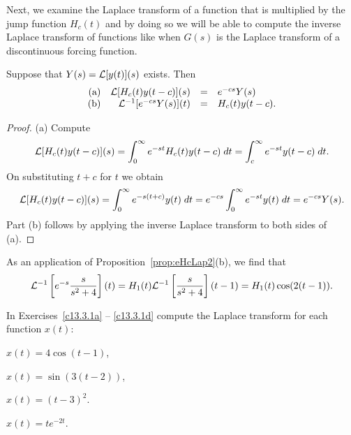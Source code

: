 \documentclass{ximera}
\begin{document}
Next, we examine the Laplace transform of a function that is multiplied 
by the jump function $H_c(t)$ and by doing so we will be able to compute the
inverse Laplace transform of functions like  when $G(s)$ is the 
Laplace transform of a discontinuous forcing function.

\begin{prop}  \label{prop:eHcLap2}
Suppose that $Y(s)={\cal L}[y(t)](s)$ exists.  Then
\[
\begin{array}{rrcl}
\mbox{(a)} & {\cal L}[H_c(t)y(t-c)](s) & = & e^{-cs} Y(s) \\
\mbox{(b)} & {\cal L}^{-1}[e^{-cs}Y(s)](t) & = & H_c(t)y(t-c).
\end{array}
\]
\end{prop}

\begin{proof} (a)  Compute
\[
{\cal L}[H_c(t)y(t-c)](s) = \int_0^{\infty} e^{-st}H_c(t) y(t-c)\; dt
= \int_c^{\infty} e^{-st}y(t-c)\; dt.
\]
On substituting $t+c$ for $t$ we obtain
\[
{\cal L}[H_c(t)y(t-c)](s)=\int_0^{\infty} e^{-s(t+c)}y(t)\; dt
=e^{-cs} \int_0^{\infty} e^{-st}y(t)\; dt
=e^{-cs} Y(s).
\]
Part (b) follows by applying the inverse Laplace transform to both sides 
of (a).  \end{proof}

As an application of Proposition~\ref{prop:eHcLap2}(b), we find that
\[
{\cal L}^{-1}\left[ e^{-s}\frac{s}{s^2+4}\right](t)=
H_1(t){\cal L}^{-1}\left[ \frac{s}{s^2+4}\right](t-1)=
H_1(t)\cos(2(t-1)).
\]

\EXER

\TEXER

\noindent In Exercises~\ref{c13.3.1a} -- \ref{c13.3.1d} compute the Laplace 
transform for each function $x(t)$:
\begin{exercise} \label{c13.3.1a}
$x(t) = 4\cos(t-1)$,
\end{exercise}
\begin{exercise} \label{c13.3.1b}
$x(t) = \sin(3(t-2))$,
\end{exercise}
\begin{exercise} \label{c13.3.1c}
$x(t) = (t-3)^2$.
\end{exercise}
\begin{exercise} \label{c13.3.1d}
$x(t) = te^{-2t}$.
\end{exercise}
\end{document}
